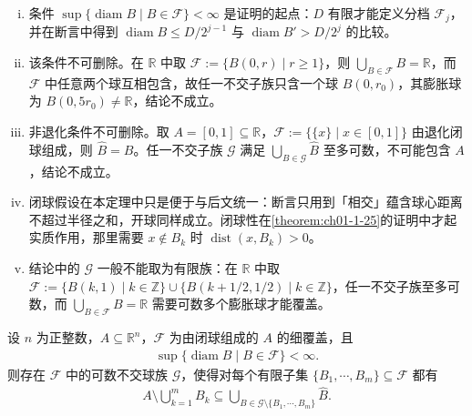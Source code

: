\documentclass[../../main.tex]{subfiles}%
\begin{document}
\begin{remark}\label{remark:ch01-thm-1-24-条件}
\begin{enumerate}[(i)]
\item 条件 $\sup\{\operatorname{diam}B\mid B\in\mathcal{F}\}<\infty$ 是证明的起点：$D$ 有限才能定义分档 $\mathcal{F}_j$，并在断言中得到 $\operatorname{diam}B\leqslant D/2^{j-1}$ 与 $\operatorname{diam}B'>D/2^{j}$ 的比较。
\item 该条件不可删除。在 $\mathbb{R}$ 中取 $\mathcal{F}:=\{B(0,r)\mid r\geqslant1\}$，则 $\bigcup_{B\in\mathcal{F}}B=\mathbb{R}$，而 $\mathcal{F}$ 中任意两个球互相包含，故任一不交子族只含一个球 $B(0,r_0)$，其膨胀球为 $B(0,5r_0)\neq\mathbb{R}$，结论不成立。
\item 非退化条件不可删除。取 $A=[0,1]\subseteq\mathbb{R}$，$\mathcal{F}:=\{\{x\}\mid x\in[0,1]\}$ 由退化闭球组成，则 $\hat B=B$。任一不交子族 $\mathcal{G}$ 满足 $\bigcup_{B\in\mathcal{G}}\hat B$ 至多可数，不可能包含 $A$，结论不成立。
\item 闭球假设在本定理中只是便于与后文统一：断言只用到「相交」蕴含球心距离不超过半径之和，开球同样成立。闭球性在\cref{theorem:ch01-1-25}的证明中才起实质作用，那里需要 $x\notin B_k$ 时 $\operatorname{dist}(x,B_k)>0$。%
\item 结论中的 $\mathcal{G}$ 一般不能取为有限族：在 $\mathbb{R}$ 中取 $\mathcal{F}:=\{B(k,1)\mid k\in\mathbb{Z}\}\cup\{B(k+1/2,1/2)\mid k\in\mathbb{Z}\}$，任一不交子族至多可数，而 $\bigcup_{B\in\mathcal{F}}B=\mathbb{R}$ 需要可数多个膨胀球才能覆盖。
\end{enumerate}
\end{remark}

\begin{theorem}\label{theorem:ch01-1-25}
设 $n$ 为正整数，$A\subseteq\mathbb{R}^n$，$\mathcal{F}$ 为由闭球组成的 $A$ 的细覆盖，且
\begin{align*}
\sup\{\operatorname{diam}B\mid B\in\mathcal{F}\}<\infty .
\end{align*}
则存在 $\mathcal{F}$ 中的可数不交球族 $\mathcal{G}$，使得对每个有限子集 $\{B_1,\cdots,B_m\}\subseteq\mathcal{F}$ 都有
\begin{align*}
A\setminus\bigcup_{k=1}^{m}B_k\subseteq\bigcup_{B\in\mathcal{G}\setminus\{B_1,\cdots,B_m\}}\hat B .
\end{align*}
\end{theorem}
\end{document}
